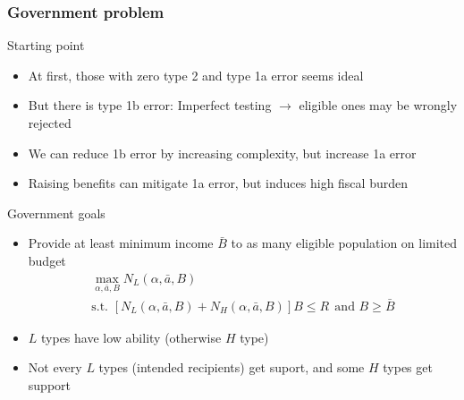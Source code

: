 \documentclass[aspectratio=169]{beamer}
\begin{document}
\begin{frame}
\frametitle{Government problem} 
Starting point 
\begin{itemize}\setlength\itemsep{3pt}
\item At first, those with zero type 2 and type 1a error seems ideal
\item But there is type 1b error: Imperfect testing $\to$ eligible ones may be wrongly rejected
\item We can reduce 1b error by increasing complexity, but increase 1a error
\item Raising benefits can mitigate 1a error, but induces high fiscal burden
\end{itemize}\medskip
Government goals
\begin{itemize}\setlength\itemsep{3pt}
\item Provide at least minimum income $\bar{B}$ to as many eligible population on limited budget
\begin{gather*}
  \max_{\alpha, \bar{a}, B} N_L(\alpha, \bar{a}, B) \\
  \text{s.t. } [N_L(\alpha, \bar{a}, B)+N_H(\alpha, \bar{a}, B)]B\leq R \ \ \text{and } B\geq \bar{B}
\end{gather*}
\item $L$ types have low ability (otherwise $H$ type)
\item Not every $L$ types (intended recipients) get suport, and some $H$ types get support
\end{itemize}\medskip
\end{frame}
\end{document}
